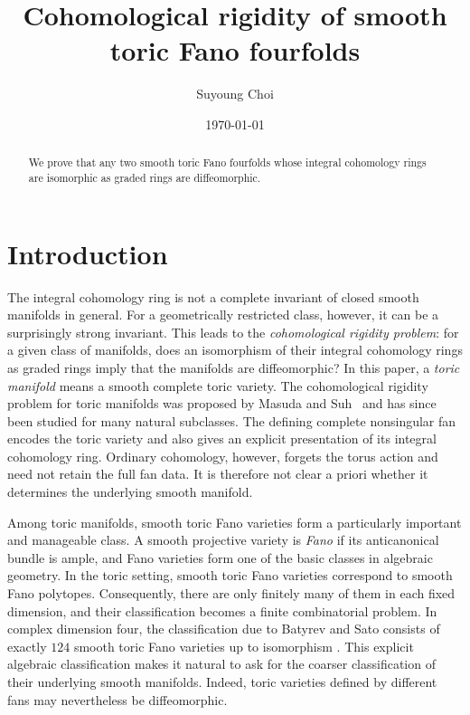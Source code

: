 \documentclass{amsart}
\title{Cohomological rigidity of smooth toric Fano fourfolds}
\author[S. Choi]{Suyoung Choi}
\date{\today}
\numberwithin{equation}{section}
\theoremstyle{definition}
\begin{document}
\begin{abstract}
    We prove that any two smooth toric Fano fourfolds whose integral cohomology rings are isomorphic as graded rings are diffeomorphic.
\end{abstract}
\maketitle

\section{Introduction}

The integral cohomology ring is not a complete invariant of closed smooth manifolds in general. 
For a geometrically restricted class, however, it can be a surprisingly strong invariant. 
This leads to the \emph{cohomological rigidity problem}: for a given class of manifolds, does an isomorphism of their integral cohomology rings as graded rings imply that the manifolds are diffeomorphic?
In this paper, a \emph{toric manifold} means a smooth complete toric variety.
The cohomological rigidity problem for toric manifolds was proposed by Masuda and Suh~\cite{Masuda-Suh2008} and has since been studied for many natural subclasses.
The defining complete nonsingular fan encodes the toric variety and also gives an explicit presentation of its integral cohomology ring.
Ordinary cohomology, however, forgets the torus action and need not retain the full fan data.
It is therefore not clear a priori whether it determines the underlying smooth manifold.

Among toric manifolds, smooth toric Fano varieties form a particularly important and manageable class. 
A smooth projective variety is \emph{Fano} if its anticanonical bundle is ample, and Fano varieties form one of the basic classes in algebraic geometry. 
In the toric setting, smooth toric Fano varieties correspond to smooth Fano polytopes. 
Consequently, there are only finitely many of them in each fixed dimension, and their classification becomes a
finite combinatorial problem. 
In complex dimension four, the classification due to Batyrev and Sato consists of exactly $124$ smooth toric Fano varieties up to isomorphism \cite{Batyrev1999,Sato2000}. 
This explicit algebraic classification makes it natural to ask for the coarser classification of their underlying smooth manifolds. 
Indeed, toric varieties defined by different fans may nevertheless be diffeomorphic.
\end{document}

